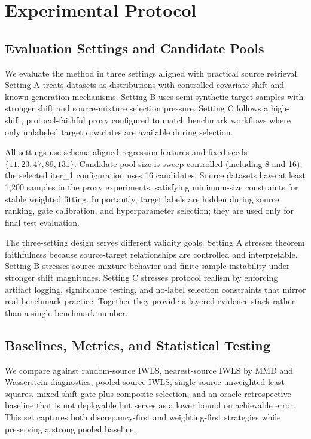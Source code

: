 \documentclass{article} %
\begin{document}
\section{Experimental Protocol}
\subsection{Evaluation Settings and Candidate Pools}
We evaluate the method in three settings aligned with practical source retrieval. Setting A treats datasets as distributions with controlled covariate shift and known generation mechanisms. Setting B uses semi-synthetic target samples with stronger shift and source-mixture selection pressure. Setting C follows a high-shift, protocol-faithful proxy configured to match benchmark workflows where only unlabeled target covariates are available during selection.

All settings use schema-aligned regression features and fixed seeds \(\{11,23,47,89,131\}\). Candidate-pool size is sweep-controlled (including 8 and 16); the selected iter\_1 configuration uses 16 candidates. Source datasets have at least 1{,}200 samples in the proxy experiments, satisfying minimum-size constraints for stable weighted fitting. Importantly, target labels are hidden during source ranking, gate calibration, and hyperparameter selection; they are used only for final test evaluation.

The three-setting design serves different validity goals. Setting A stresses theorem faithfulness because source-target relationships are controlled and interpretable. Setting B stresses source-mixture behavior and finite-sample instability under stronger shift magnitudes. Setting C stresses protocol realism by enforcing artifact logging, significance testing, and no-label selection constraints that mirror real benchmark practice. Together they provide a layered evidence stack rather than a single benchmark number.

\subsection{Baselines, Metrics, and Statistical Testing}
We compare against random-source IWLS, nearest-source IWLS by MMD and Wasserstein diagnostics, pooled-source IWLS, single-source unweighted least squares, mixed-shift gate plus composite selection, and an oracle retrospective baseline that is not deployable but serves as a lower bound on achievable error. This set captures both discrepancy-first and weighting-first strategies while preserving a strong pooled baseline.
\end{document}
